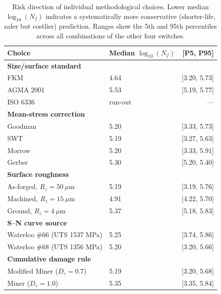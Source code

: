 \documentclass[twocolumn,12pt,a4paper]{article}
\begin{document}
\begin{table}[ht]
\centering
\caption{Risk direction of individual methodological choices. Lower
median $\log_{10}(N_f)$ indicates a systematically more conservative
(shorter-life, safer but costlier) prediction. Ranges show the 5th
and 95th percentiles across all combinations of the other four
switches.\label{tab:risk}}
\footnotesize
\begin{tabular}{llr}
\toprule
Choice & Median $\log_{10}(N_f)$ & [P5, P95] \\
\midrule
\multicolumn{3}{l}{\textbf{Size/surface standard}} \\
  FKM & 4.64 & [3.20, 5.73] \\
  AGMA 2001 & 5.53 & [5.19, 5.77] \\
  ISO 6336 & run-out & --- \\
\midrule
\multicolumn{3}{l}{\textbf{Mean-stress correction}} \\
  Goodman & 5.20 & [3.33, 5.73] \\
  SWT & 5.19 & [3.27, 5.63] \\
  Morrow & 5.20 & [3.33, 5.91] \\
  Gerber & 5.30 & [5.20, 5.40] \\
\midrule
\multicolumn{3}{l}{\textbf{Surface roughness}} \\
  As-forged, $R_z=50~\mu$m & 5.19 & [3.19, 5.76] \\
  Machined, $R_z=15~\mu$m & 4.91 & [4.22, 5.70] \\
  Ground, $R_z=4~\mu$m & 5.37 & [5.18, 5.83] \\
\midrule
\multicolumn{3}{l}{\textbf{S--N curve source}} \\
  Waterloo \#66 (UTS 1537 MPa) & 5.25 & [3.74, 5.86] \\
  Waterloo \#68 (UTS 1356 MPa) & 5.20 & [3.20, 5.66] \\
\midrule
\multicolumn{3}{l}{\textbf{Cumulative damage rule}} \\
  Modified Miner ($D_c=0.7$) & 5.19 & [3.20, 5.68] \\
  Miner ($D_c=1.0$) & 5.35 & [3.35, 5.84] \\
\bottomrule
\end{tabular}
\end{table}
\end{document}
